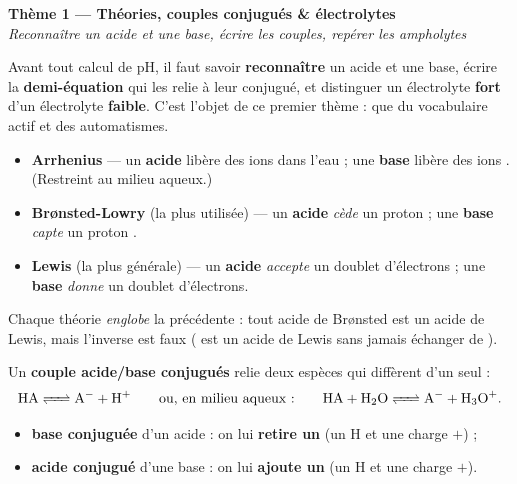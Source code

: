 \documentclass[11pt,a4paper]{article}
\begin{document}

\begin{center}
{\LARGE\bfseries\color{primarydark} Thème 1 — Théories, couples conjugués \& électrolytes}\\[2pt]
{\color{primary}\itshape Reconnaître un acide et une base, écrire les couples, repérer les ampholytes}
\end{center}

\medskip
Avant tout calcul de pH, il faut savoir \textbf{reconnaître} un acide et une base, écrire la
\textbf{demi-équation} qui les relie à leur conjugué, et distinguer un électrolyte \textbf{fort} d'un
électrolyte \textbf{faible}. C'est l'objet de ce premier thème : que du vocabulaire actif et des automatismes.

\begin{cle}
\begin{itemize}[leftmargin=1.5em,topsep=2pt,itemsep=2pt]
  \item \textbf{Arrhenius} — un \textbf{acide} libère des ions  dans l'eau ; une \textbf{base} libère
        des ions . (Restreint au milieu aqueux.)
  \item \textbf{Brønsted-Lowry} (la plus utilisée) — un \textbf{acide} \emph{cède} un proton  ; une
        \textbf{base} \emph{capte} un proton .
  \item \textbf{Lewis} (la plus générale) — un \textbf{acide} \emph{accepte} un doublet d'électrons ; une
        \textbf{base} \emph{donne} un doublet d'électrons.
\end{itemize}
Chaque théorie \emph{englobe} la précédente : tout acide de Brønsted est un acide de Lewis, mais l'inverse est
faux ( est un acide de Lewis sans jamais échanger de ).
\end{cle}

\begin{methode}
Un \textbf{couple acide/base conjugués}  relie deux espèces qui diffèrent d'un seul  :
\[ \ce{HA <=> A- + H+}\qquad\text{ou, en milieu aqueux :}\qquad \ce{HA + H2O <=> A- + H3O+}. \]
\begin{itemize}[leftmargin=1.5em,topsep=2pt,itemsep=1.5pt]
  \item \textbf{base conjuguée} d'un acide : on lui \textbf{retire un } (un H et une charge $+$) ;
  \item \textbf{acide conjugué} d'une base : on lui \textbf{ajoute un } (un H et une charge $+$).
\end{itemize}
\end{methode}
\end{document}
